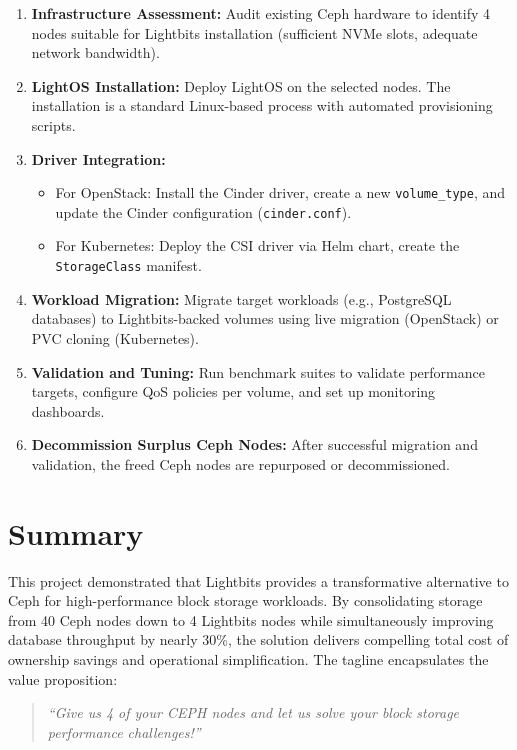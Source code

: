 \documentclass[12pt,a4paper,oneside]{report}
\begin{document}
\begin{enumerate}
    \item \textbf{Infrastructure Assessment:} Audit existing Ceph hardware to identify 4 nodes suitable for Lightbits installation (sufficient NVMe slots, adequate network bandwidth).
    \item \textbf{LightOS Installation:} Deploy LightOS on the selected nodes. The installation is a standard Linux-based process with automated provisioning scripts.
    \item \textbf{Driver Integration:}
    \begin{itemize}
        \item For OpenStack: Install the Cinder driver, create a new \texttt{volume\_type}, and update the Cinder configuration (\texttt{cinder.conf}).
        \item For Kubernetes: Deploy the CSI driver via Helm chart, create the \texttt{StorageClass} manifest.
    \end{itemize}
    \item \textbf{Workload Migration:} Migrate target workloads (e.g., PostgreSQL databases) to Lightbits-backed volumes using live migration (OpenStack) or PVC cloning (Kubernetes).
    \item \textbf{Validation and Tuning:} Run benchmark suites to validate performance targets, configure QoS policies per volume, and set up monitoring dashboards.
    \item \textbf{Decommission Surplus Ceph Nodes:} After successful migration and validation, the freed Ceph nodes are repurposed or decommissioned.
\end{enumerate}

\section{Summary}

This project demonstrated that Lightbits provides a transformative alternative to Ceph for high-performance block storage workloads. By consolidating storage from 40 Ceph nodes down to 4 Lightbits nodes while simultaneously improving database throughput by nearly 30\%, the solution delivers compelling total cost of ownership savings and operational simplification. The tagline encapsulates the value proposition:

\begin{quote}
\textit{``Give us 4 of your CEPH nodes and let us solve your block storage performance challenges!''}
\end{quote}
\end{document}
